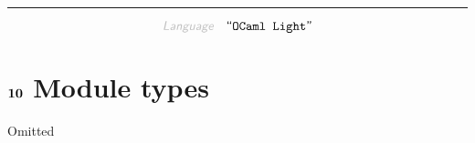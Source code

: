 

\begin{center}
\rule{3in}{0.4pt}
\end{center}

\begin{displaymath}
\KEY{Language} \quad \STRING{OCaml Light}
\end{displaymath}

\section{$\SECT{10}$ Module types}\hypertarget{SectionNumber:10}{}\label{SectionNumber:10}

Omitted



